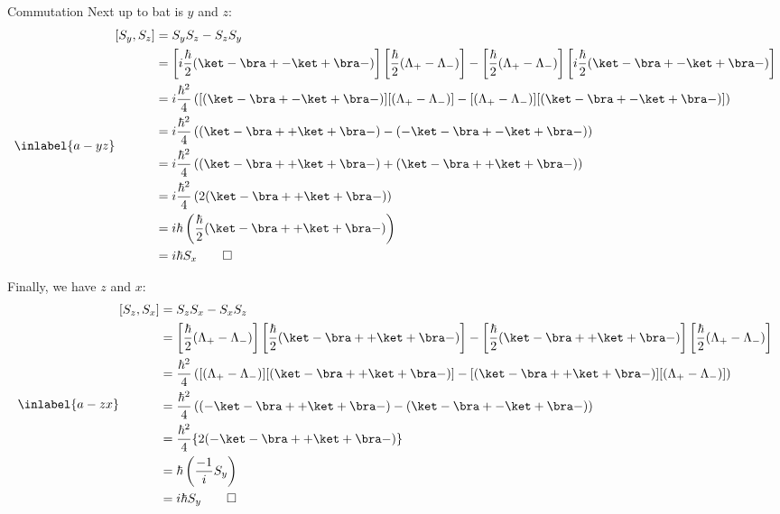 \begin{answer}
\begin{answerpart}{Commutation}
    Next up to bat is $y$ and $z$:
    \begin{equation}
      \inlabel{a-yz}
      \begin{split}
        [S_y, S_z]
        &= S_yS_z - S_zS_y \\
        &=
        \left[i \frac \hbar 2 (\ket - \bra + - \ket + \bra -)\right]
        \left[\frac \hbar 2 (\Lambda_+ - \Lambda_-)\right]
        -
        \left[\frac \hbar 2 (\Lambda_+ - \Lambda_-)\right]
        \left[i \frac \hbar 2 (\ket - \bra + - \ket + \bra -)\right]
        \\
        &= i \frac{\hbar^2}{4}
        \left(
        [(\ket - \bra + - \ket + \bra -)]
        [(\Lambda_+ - \Lambda_-)]
        -
        [(\Lambda_+ - \Lambda_-)]
        [(\ket - \bra + - \ket + \bra -)]
        \right)
        \\
        &= i \frac{\hbar^2}{4}
        \left(
        (\ket - \bra + + \ket + \bra -)
        -
        (-\ket - \bra + - \ket + \bra -)
        \right)
        \\
        &= i \frac{\hbar^2}{4}
        \left(
        (\ket - \bra + + \ket + \bra -)
        +
        (\ket - \bra + + \ket + \bra -)
        \right)
        \\
        &= i \frac{\hbar^2}{4}
        \left( 2(\ket - \bra + + \ket + \bra -) \right)
        \\
        &= i \hbar
        \left(
        \frac{\hbar}{2} (\ket - \bra + + \ket + \bra -)
        \right)
        \\
        &= i \hbar S_x \qed\\
      \end{split}
    \end{equation}

    Finally, we have $z$ and $x$:
    \begin{equation}
      \inlabel{a-zx}
      \begin{split}
        [S_z, S_x]
        &= S_zS_x - S_xS_z \\
        &=
        \left[\frac \hbar 2 (\Lambda_+ - \Lambda_-)\right]
        \left[\frac \hbar 2 (\ket - \bra + + \ket + \bra -)\right]
        -
        \left[\frac \hbar 2 (\ket - \bra + + \ket + \bra -)\right]
        \left[\frac \hbar 2 (\Lambda_+ - \Lambda_-)\right]
        \\
        &=
        \frac{\hbar^2}{4}
        \left(
        [(\Lambda_+ - \Lambda_-)][(\ket - \bra + + \ket + \bra -)]
        -
        [(\ket - \bra + + \ket + \bra -)][(\Lambda_+ - \Lambda_-)]
        \right)
        \\
        &=
        \frac{\hbar^2}{4}
        \left(
        (-\ket - \bra + + \ket + \bra -)
        -
        (\ket - \bra + - \ket + \bra -)
        \right)
        \\
        &= \frac{\hbar^2}{4} \{ 2(-\ket - \bra + + \ket + \bra -) \}\\
        &= \hbar \left( \frac{-1}{i}S_y \right)\\
        &= i \hbar S_y \qed
        \\
      \end{split}
    \end{equation}


\end{answerpart}
\end{answer}
